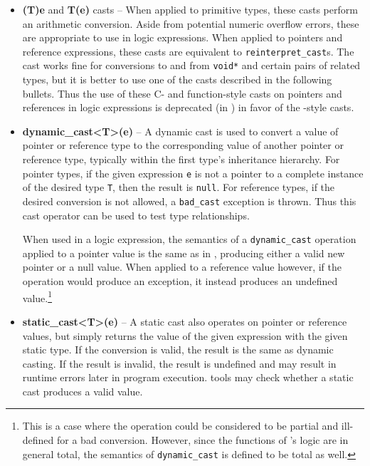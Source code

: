 \begin{itemize}
	\item \textbf{(T)e} and \textbf{T(e)} casts -- When applied to primitive types, these casts perform an arithmetic conversion. Aside from potential numeric overflow errors, these are appropriate to use in logic expressions. When applied to pointers and reference expressions, these casts are equivalent to
	\lstinline|reinterpret_cast|s. The cast works fine for conversions to and from \lstinline|void*| and certain pairs of related types, but it is better to use one of
	the \lang{} casts described in the following bullets.
	Thus the use of these C- and function-style casts on 
	pointers and references in logic expressions is 
	deprecated (in \NAME{}) in favor of the \lang{}-style casts.
	
	\item \textbf{dynamic\_cast<T>(e)} -- A dynamic cast is used to convert a value of pointer or reference type to the corresponding value of another pointer or reference type, typically within the first type's inheritance hierarchy. For pointer types, if the given expression \lstinline|e| is not a pointer to a complete instance of the desired type \lstinline|T|, then the result is \lstinline|null|. For reference types, if the desired conversion is not allowed, a \lstinline|bad_cast| exception is thrown. Thus this cast operator can be used to test type relationships.
	
	When used in a logic expression, the semantics of a \lstinline|dynamic_cast| operation applied to a pointer value is the same as in \lang{}, producing either a valid new pointer or a null value. When applied to a reference value however, if the operation would produce an exception, it instead produces an undefined value.\footnote{This is a case where the operation could be considered to be partial and ill-defined for a bad conversion. However, since the  functions of \NAME{}'s logic are in general total, the semantics of \lstinline|dynamic_cast| is defined to be total as well.}  
	
	\item \textbf{static\_cast<T>(e)} -- A static cast also operates on pointer or reference values, but simply returns the value of the given expression with the given static type. If the conversion is valid, the result is the same as dynamic casting. If the result is invalid, the result is undefined and may result in runtime errors later in program execution. \NAME{} tools may check whether a static cast produces a valid value.
	

\end{itemize}
